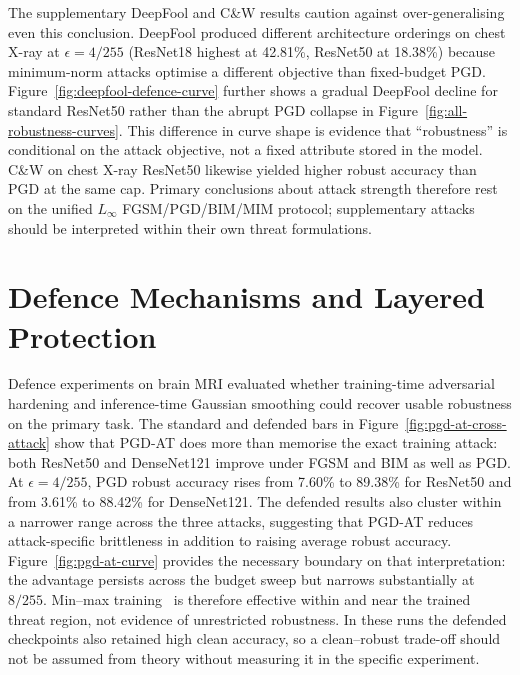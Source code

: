 \documentclass[12pt,a4paper,oneside]{report}
\begin{document}
The supplementary DeepFool and C\&W results caution against over-generalising even this conclusion. DeepFool produced different architecture orderings on chest X-ray at $\epsilon = 4/255$ (ResNet18 highest at 42.81\%, ResNet50 at 18.38\%) because minimum-norm attacks optimise a different objective than fixed-budget PGD. Figure~\ref{fig:deepfool-defence-curve} further shows a gradual DeepFool decline for standard ResNet50 rather than the abrupt PGD collapse in Figure~\ref{fig:all-robustness-curves}. This difference in curve shape is evidence that ``robustness'' is conditional on the attack objective, not a fixed attribute stored in the model. C\&W on chest X-ray ResNet50 likewise yielded higher robust accuracy than PGD at the same cap. Primary conclusions about attack strength therefore rest on the unified $L_\infty$ FGSM/PGD/BIM/MIM protocol; supplementary attacks should be interpreted within their own threat formulations.

\section{Defence Mechanisms and Layered Protection}
\label{sec:disc-defence}


Defence experiments on brain MRI evaluated whether training-time adversarial hardening and inference-time Gaussian smoothing could recover usable robustness on the primary task. The standard and defended bars in Figure~\ref{fig:pgd-at-cross-attack} show that PGD-AT does more than memorise the exact training attack: both ResNet50 and DenseNet121 improve under FGSM and BIM as well as PGD. At $\epsilon = 4/255$, PGD robust accuracy rises from 7.60\% to 89.38\% for ResNet50 and from 3.61\% to 88.42\% for DenseNet121. The defended results also cluster within a narrower range across the three attacks, suggesting that PGD-AT reduces attack-specific brittleness in addition to raising average robust accuracy. Figure~\ref{fig:pgd-at-curve} provides the necessary boundary on that interpretation: the advantage persists across the budget sweep but narrows substantially at $8/255$. Min--max training~\cite{madry2018towards} is therefore effective within and near the trained threat region, not evidence of unrestricted robustness. In these runs the defended checkpoints also retained high clean accuracy, so a clean--robust trade-off should not be assumed from theory without measuring it in the specific experiment.
\end{document}
